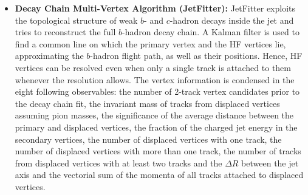\begin{itemize}
\item \textbf{Decay Chain Multi-Vertex Algorithm (JetFitter):} JetFitter exploits the topological structure of weak $b$- and $c$-hadron decays inside the jet and tries to reconstruct the full $b$-hadron decay chain. A Kalman filter is used to find a common line on which the primary vertex and the HF vertices lie, approximating the $b$-hadron flight path, as well as their positions. Hence, HF vertices can be resolved even when only a single track is attached to them whenever the resolution allows. The vertex information is condensed in the eight following observables: the number of 2-track vertex candidates prior to the decay chain fit, the invariant mass of tracks from displaced vertices assuming pion masses, the significance of the average distance between the primary and displaced vertices, the fraction of the charged jet energy in the secondary vertices, the number of displaced vertices with one track, the number of displaced vertices with more than one track, the number of tracks from displaced vertices with at least two tracks and the $\Delta R$ between the jet axis and the vectorial sum of the momenta of all tracks attached to displaced vertices.

\end{itemize}

